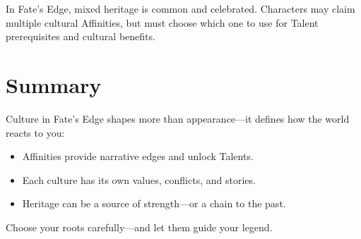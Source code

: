 In Fate’s Edge, mixed heritage is common and celebrated. Characters may claim multiple cultural Affinities, but must choose which one to use for Talent prerequisites and cultural benefits.

\section{Summary}

Culture in Fate’s Edge shapes more than appearance—it defines how the world reacts to you:

\begin{itemize}
  \item Affinities provide narrative edges and unlock Talents.
  \item Each culture has its own values, conflicts, and stories.
  \item Heritage can be a source of strength—or a chain to the past.
\end{itemize}

Choose your roots carefully—and let them guide your legend.
